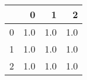 \begin{tabular}{lrrr}
\toprule
{} &    0 &    1 &    2 \\
\midrule
0 &  1.0 &  1.0 &  1.0 \\
1 &  1.0 &  1.0 &  1.0 \\
2 &  1.0 &  1.0 &  1.0 \\
\bottomrule
\end{tabular}
